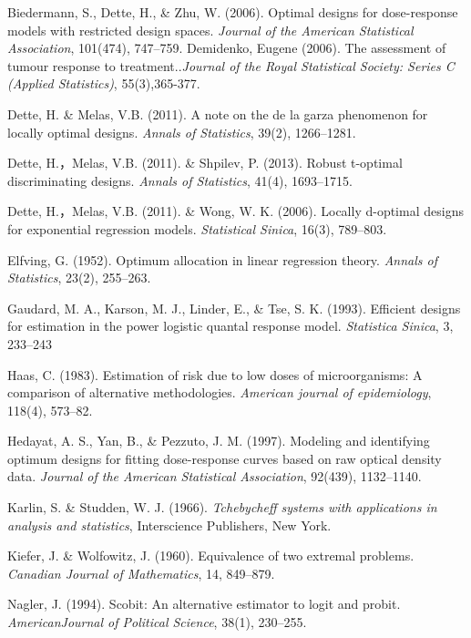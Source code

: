 \documentclass[12pt]{TD-CJS}
\begin{document}
\begin{thebibliography}{}
Biedermann, S., Dette, H., \& Zhu, W. (2006). Optimal designs for dose-response models with restricted design spaces. {\it Journal of the American Statistical Association}, 101(474), 747--759.
Demidenko, Eugene (2006). The assessment of tumour response to treatment..{\it Journal of the Royal Statistical Society: Series C (Applied Statistics)}, 55(3),365-377.

Dette, H. \& Melas, V.B. (2011). A note on the de la garza phenomenon for locally optimal designs. {\it Annals of Statistics}, 39(2), 1266--1281.

Dette, H.，Melas, V.B. (2011). \& Shpilev, P. (2013). Robust t-optimal discriminating designs. {\it Annals of Statistics}, 41(4), 1693--1715.

Dette, H.，Melas, V.B. (2011). \& Wong, W. K. (2006). Locally d-optimal designs for exponential regression models. {\it Statistical Sinica}, 16(3), 789--803.

Elfving, G. (1952). Optimum allocation in linear regression theory. {\it Annals of Statistics}, 23(2), 255--263.

Gaudard, M. A., Karson, M. J., Linder, E., \& Tse, S. K. (1993). Efficient designs for estimation in the power logistic quantal response model. {\it Statistica Sinica}, 3, 233--243


Haas, C. (1983). Estimation of risk due to low doses of microorganisms: A comparison of alternative methodologies. {\it American journal of epidemiology}, 118(4), 573--82.

Hedayat, A. S., Yan, B., \& Pezzuto, J. M. (1997). Modeling and  identifying optimum designs for fitting dose-response curves based on raw optical density data. {\it Journal of the American Statistical Association}, 92(439), 1132–1140.

Karlin, S. \& Studden, W. J. (1966).  {\it Tchebycheff systems with applications in analysis and statistics}, Interscience Publishers, New York.

Kiefer, J. \& Wolfowitz, J. (1960). Equivalence of two extremal problems. {\it Canadian Journal of Mathematics}, 14, 849--879.

Nagler, J. (1994). Scobit: An alternative estimator to logit and probit. {\it AmericanJournal of Political Science}, 38(1), 230–255.


\end{thebibliography}
\end{document}
